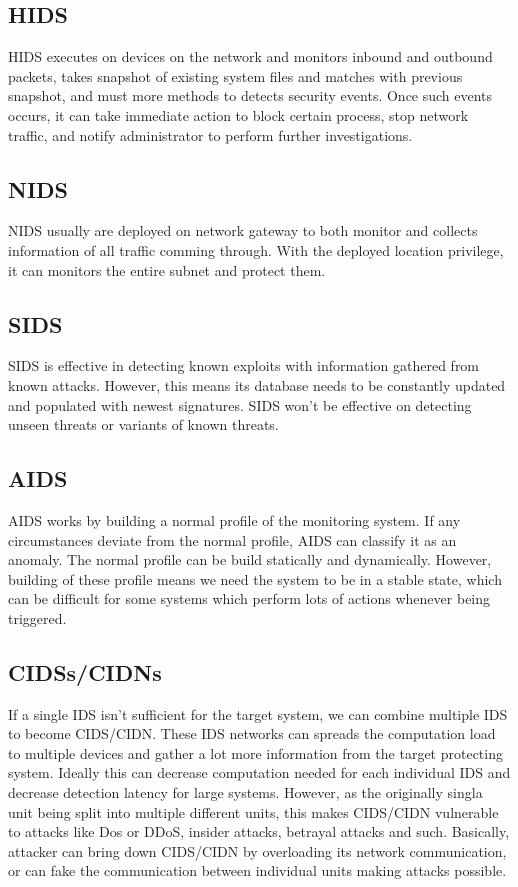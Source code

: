 \documentclass[12pt]{report}
\begin{document}
\subsection{HIDS}
HIDS executes on devices on the network and monitors inbound and outbound packets, takes snapshot of existing system files and matches with previous snapshot, and must more methods to detects security events. Once such events occurs, it can take immediate action to block certain process, stop network traffic, and notify administrator to perform further investigations.

\subsection{NIDS}
NIDS usually are deployed on network gateway to both monitor and collects information of all traffic comming through. With the deployed location privilege, it can monitors the entire subnet and protect them.

\subsection{SIDS}
SIDS is effective in detecting known exploits with information gathered from known attacks. However, this means its database needs to be constantly updated and populated with newest signatures. SIDS won't be effective on detecting unseen threats or variants of known threats.

\subsection{AIDS}
AIDS works by building a normal profile of the monitoring system. If any circumstances deviate from the normal profile, AIDS can classify it as an anomaly. The normal profile can be build statically and dynamically. However, building of these profile means we need the system to be in a stable state, which can be difficult for some systems which perform lots of actions whenever being triggered.

\subsection{CIDSs/CIDNs}
If a single IDS isn't sufficient for the target system, we can combine multiple IDS to become CIDS/CIDN. These IDS networks can spreads the computation load to multiple devices and gather a lot more information from the target protecting system. Ideally this can decrease computation needed for each individual IDS and decrease detection latency for large systems. However, as the originally singla unit being split into multiple different units, this makes CIDS/CIDN vulnerable to attacks like Dos or DDoS, insider attacks, betrayal attacks and such. Basically, attacker can bring down CIDS/CIDN by overloading its network communication, or can fake the communication between individual units making attacks possible. \\
\end{document}
